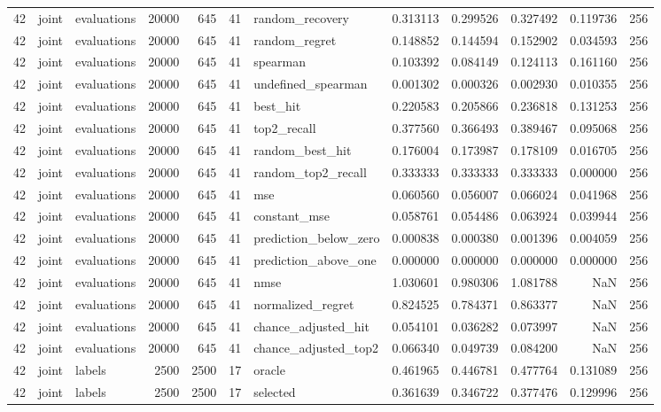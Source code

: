 \begin{tabular}{rllrrrlrrrrr}
42 & joint & evaluations & 20000 & 645 & 41 & random_recovery & 0.313113 & 0.299526 & 0.327492 & 0.119736 & 256 \\
42 & joint & evaluations & 20000 & 645 & 41 & random_regret & 0.148852 & 0.144594 & 0.152902 & 0.034593 & 256 \\
42 & joint & evaluations & 20000 & 645 & 41 & spearman & 0.103392 & 0.084149 & 0.124113 & 0.161160 & 256 \\
42 & joint & evaluations & 20000 & 645 & 41 & undefined_spearman & 0.001302 & 0.000326 & 0.002930 & 0.010355 & 256 \\
42 & joint & evaluations & 20000 & 645 & 41 & best_hit & 0.220583 & 0.205866 & 0.236818 & 0.131253 & 256 \\
42 & joint & evaluations & 20000 & 645 & 41 & top2_recall & 0.377560 & 0.366493 & 0.389467 & 0.095068 & 256 \\
42 & joint & evaluations & 20000 & 645 & 41 & random_best_hit & 0.176004 & 0.173987 & 0.178109 & 0.016705 & 256 \\
42 & joint & evaluations & 20000 & 645 & 41 & random_top2_recall & 0.333333 & 0.333333 & 0.333333 & 0.000000 & 256 \\
42 & joint & evaluations & 20000 & 645 & 41 & mse & 0.060560 & 0.056007 & 0.066024 & 0.041968 & 256 \\
42 & joint & evaluations & 20000 & 645 & 41 & constant_mse & 0.058761 & 0.054486 & 0.063924 & 0.039944 & 256 \\
42 & joint & evaluations & 20000 & 645 & 41 & prediction_below_zero & 0.000838 & 0.000380 & 0.001396 & 0.004059 & 256 \\
42 & joint & evaluations & 20000 & 645 & 41 & prediction_above_one & 0.000000 & 0.000000 & 0.000000 & 0.000000 & 256 \\
42 & joint & evaluations & 20000 & 645 & 41 & nmse & 1.030601 & 0.980306 & 1.081788 & NaN & 256 \\
42 & joint & evaluations & 20000 & 645 & 41 & normalized_regret & 0.824525 & 0.784371 & 0.863377 & NaN & 256 \\
42 & joint & evaluations & 20000 & 645 & 41 & chance_adjusted_hit & 0.054101 & 0.036282 & 0.073997 & NaN & 256 \\
42 & joint & evaluations & 20000 & 645 & 41 & chance_adjusted_top2 & 0.066340 & 0.049739 & 0.084200 & NaN & 256 \\
42 & joint & labels & 2500 & 2500 & 17 & oracle & 0.461965 & 0.446781 & 0.477764 & 0.131089 & 256 \\
42 & joint & labels & 2500 & 2500 & 17 & selected & 0.361639 & 0.346722 & 0.377476 & 0.129996 & 256 \\

\end{tabular}
